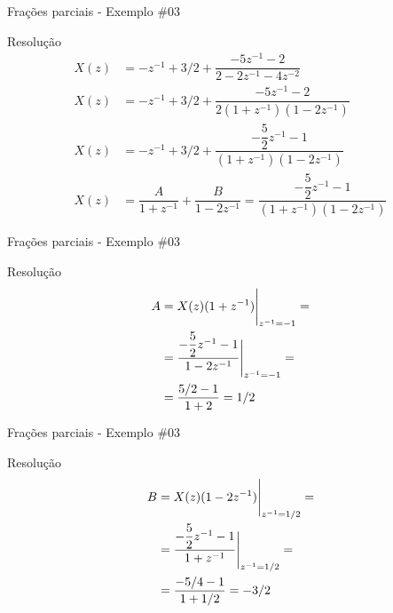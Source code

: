 \begin{frame}{Frações parciais - Exemplo \#03}
\begin{block}{Resolução}
	\begin{align*}
	X(z)&=-z^{-1}+3/2+\dfrac{-5z^{-1}-2}{2-2z^{-1}-4z^{-2}}\\
	X(z)&=-z^{-1}+3/2+\dfrac{-5z^{-1}-2}{2(1+z^{-1})(1-2z^{-1})}\\
	X(z)&=-z^{-1}+3/2+\dfrac{-\dfrac{5}{2}z^{-1}-1}{(1+z^{-1})(1-2z^{-1})}\\
	X(z)&=\dfrac{A}{1+z^{-1}}+\dfrac{B}{1-2z^{-1}}=\dfrac{-\dfrac{5}{2} z^{-1}-1}{(1+z^{-1})(1-2z^{-1})}
	\end{align*}
\end{block}
\end{frame}


\begin{frame}{Frações parciais - Exemplo \#03}
\begin{block}{Resolução}
	\begin{align*}
	A&=\eval{X(z)(1+z^{-1})}_{z^{-1}=-1}=\\
	 &=\eval{\dfrac{-\dfrac{5}{2}z^{-1}-1}{1-2z^{-1}}}_{z^{-1}=-1}=\\
	 &=\dfrac{5/2-1}{1+2}=1/2
	\end{align*}
\end{block}
\end{frame}


\begin{frame}{Frações parciais - Exemplo \#03}
\begin{block}{Resolução}
	\begin{align*}
	B&=\eval{X(z)(1-2z^{-1})}_{z^{-1}=1/2}=\\
	 &=\eval{\dfrac{-\dfrac{5}{2}z^{-1}-1}{1+z^{-1}}}_{z^{-1}=1/2}=\\
	 &=\dfrac{-5/4-1}{1+1/2}=-3/2
	\end{align*}
\end{block}
\end{frame}


